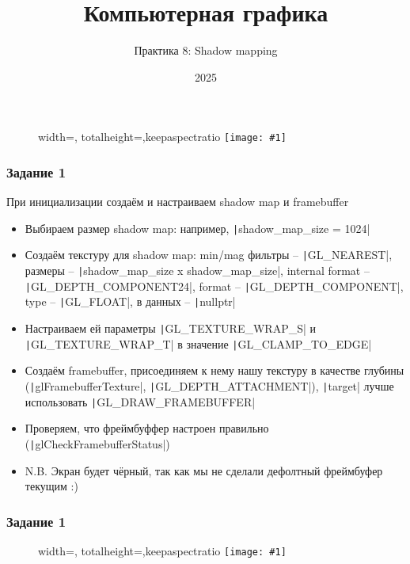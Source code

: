 \documentclass[10pt]{beamer}
\title{Компьютерная графика}
\subtitle{Практика 8: Shadow mapping}
\date{2025}
\newcommand{\slideimage}[1]{
  \begin{figure}
    \begin{adjustbox}{width=\textwidth, totalheight=\textheight-2\baselineskip-2\baselineskip,keepaspectratio}
      \texttt{[image: \#1]}
    \end{adjustbox}
  \end{figure}
}
\begin{document}

\frame{\titlepage}

\begin{frame}[fragile]
\slideimage{0.png}
\end{frame}

\begin{frame}[fragile]
\frametitle{Задание 1}
\begin{footnotesize}
При инициализации создаём и настраиваем shadow map и framebuffer
\begin{itemize}
\item Выбираем размер shadow map: например, \texttt|shadow_map_size = 1024|
\item Создаём текстуру для shadow map: min/mag фильтры -- \texttt|GL_NEAREST|, размеры -- \texttt|shadow_map_size x shadow_map_size|, internal format -- \texttt|GL_DEPTH_COMPONENT24|, format -- \texttt|GL_DEPTH_COMPONENT|, type -- \texttt|GL_FLOAT|, в данных -- \texttt|nullptr|
\item Настраиваем ей параметры \texttt|GL_TEXTURE_WRAP_S| и \texttt|GL_TEXTURE_WRAP_T| в значение \texttt|GL_CLAMP_TO_EDGE|
\item Создаём framebuffer, присоединяем к нему нашу текстуру в качестве глубины (\texttt|glFramebufferTexture|, \texttt|GL_DEPTH_ATTACHMENT|), \texttt|target| лучше использовать \texttt|GL_DRAW_FRAMEBUFFER|
\item Проверяем, что фреймбуффер настроен правильно (\texttt|glCheckFramebufferStatus|)
\item N.B. Экран будет чёрный, так как мы не сделали дефолтный фреймбуфер текущим :)
\end{itemize}
\end{footnotesize}
\end{frame}

\begin{frame}[fragile]
\frametitle{Задание 1}
\slideimage{1.png}
\end{frame}
\end{document}

